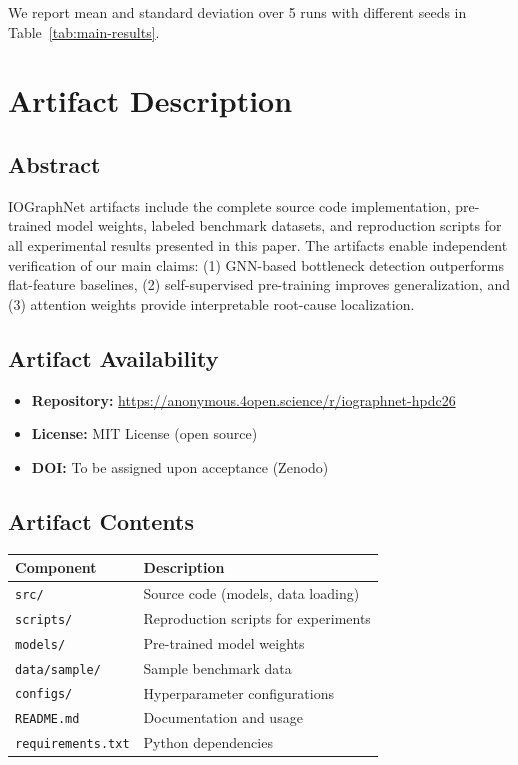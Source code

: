 We report mean and standard deviation over 5 runs with different seeds in Table~\ref{tab:main-results}.


\section{Artifact Description}
\label{app:artifact-description}

\subsection{Abstract}

IOGraphNet artifacts include the complete source code implementation, pre-trained model weights, labeled benchmark datasets, and reproduction scripts for all experimental results presented in this paper.
The artifacts enable independent verification of our main claims: (1) GNN-based bottleneck detection outperforms flat-feature baselines, (2) self-supervised pre-training improves generalization, and (3) attention weights provide interpretable root-cause localization.

\subsection{Artifact Availability}

\begin{itemize}
    \item \textbf{Repository:} {\footnotesize\url{https://anonymous.4open.science/r/iographnet-hpdc26}}
    \item \textbf{License:} MIT License (open source)
    \item \textbf{DOI:} To be assigned upon acceptance (Zenodo)
\end{itemize}

\subsection{Artifact Contents}

{\small
\begin{tabular}{@{}ll@{}}
\toprule
\textbf{Component} & \textbf{Description} \\
\midrule
\texttt{src/} & Source code (models, data loading) \\
\texttt{scripts/} & Reproduction scripts for experiments \\
\texttt{models/} & Pre-trained model weights \\
\texttt{data/sample/} & Sample benchmark data \\
\texttt{configs/} & Hyperparameter configurations \\
\texttt{README.md} & Documentation and usage \\
\texttt{requirements.txt} & Python dependencies \\
\bottomrule
\end{tabular}
}

